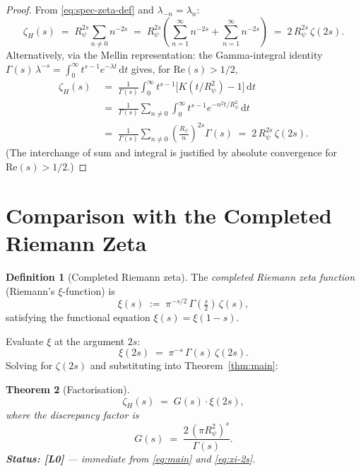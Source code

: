 \documentclass[11pt,a4paper]{article}
\newtheorem{theorem}{Theorem}[section]
\theoremstyle{definition}
\newtheorem{definition}[theorem]{Definition}
\theoremstyle{remark}
\newcommand{\Rp}{R_{\psi}}
\newcommand{\ZH}{\zeta_{H}(s)}
\newcommand{\Gam}{\Gamma}
\begin{document}
\begin{proof}
From \eqref{eq:spec-zeta-def} and $\lambda_{-n} = \lambda_n$:
\[
  \ZH \;=\; \Rp^{2s}\!\!\sum_{n \neq 0} n^{-2s}
       \;=\; \Rp^{2s}\left(\sum_{n=1}^\infty n^{-2s}
             + \sum_{n=1}^\infty n^{-2s}\right)
       \;=\; 2\,\Rp^{2s}\,\zeta(2s).
\]
Alternatively, via the Mellin representation: the Gamma-integral identity
$\Gam(s)\,\lambda^{-s} = \int_0^\infty t^{s-1} e^{-\lambda t}\,\mathrm{d}t$
gives, for $\mathrm{Re}(s) > 1/2$,
\begin{align*}
  \ZH &\;=\; \frac{1}{\Gam(s)}\int_0^\infty t^{s-1}
             \bigl[K(t/\Rp^2) - 1\bigr]\,\mathrm{d}t \\
      &\;=\; \frac{1}{\Gam(s)}\sum_{n\neq 0}\int_0^\infty
             t^{s-1} e^{-n^2 t/\Rp^2}\,\mathrm{d}t \\
      &\;=\; \frac{1}{\Gam(s)}\sum_{n\neq 0}
             \left(\frac{\Rp}{n}\right)^{2s}\!\Gam(s)
      \;=\; 2\,\Rp^{2s}\,\zeta(2s).
\end{align*}
(The interchange of sum and integral is justified by absolute convergence
for $\mathrm{Re}(s) > 1/2$.)
\end{proof}

\section{Comparison with the Completed Riemann Zeta}
\label{sec:comparison}

\begin{definition}[Completed Riemann zeta]\label{def:xi}
The \emph{completed Riemann zeta function} (Riemann's $\xi$-function) is
\begin{equation}\label{eq:xi}
  \xi(s) \;:=\; \pi^{-s/2}\,\Gam\!\left(\tfrac{s}{2}\right)\,\zeta(s),
\end{equation}
satisfying the functional equation $\xi(s) = \xi(1-s)$.
\end{definition}

Evaluate $\xi$ at the argument $2s$:
\begin{equation}\label{eq:xi-2s}
  \xi(2s) \;=\; \pi^{-s}\,\Gam(s)\,\zeta(2s).
\end{equation}
Solving for $\zeta(2s)$ and substituting into Theorem~\ref{thm:main}:

\begin{theorem}[Factorisation]\label{thm:factorisation}
\begin{equation}\label{eq:factorisation}
  \boxed{\ZH \;=\; G(s)\cdot\xi(2s),}
\end{equation}
where the \emph{discrepancy factor} is
\begin{equation}\label{eq:G}
  \boxed{G(s) \;=\; \frac{2\,(\pi\Rp^2)^s}{\Gam(s)}.}
\end{equation}
\textbf{Status: [L0]} — immediate from \eqref{eq:main} and \eqref{eq:xi-2s}.
\end{theorem}
\end{document}
